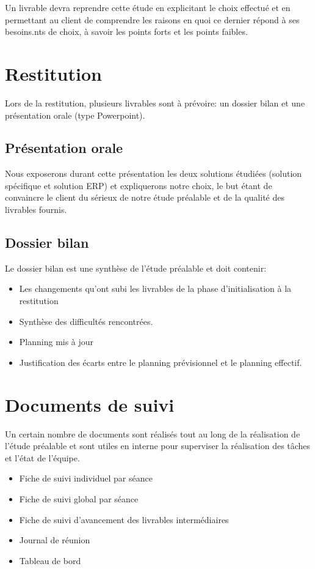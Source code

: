 		Un livrable devra reprendre cette étude en explicitant le choix effectué et en permettant au client de comprendre les raisons en quoi ce dernier répond à ses besoins.nts de choix, à savoir les points forts et les points faibles.


	\section{Restitution}

		Lors de la restitution, plusieurs livrables sont à prévoire: un dossier bilan et une présentation orale (type Powerpoint).

		\subsection{Présentation orale}

		Nous exposerons durant cette présentation les deux solutions étudiées (solution spécifique et solution ERP) et expliquerons notre choix, le but étant de convaincre le client du sérieux de notre étude préalable et de la qualité des livrables fournis.

		\subsection{Dossier bilan}

		Le dossier bilan est une synthèse de l'étude préalable et doit contenir:

		\begin{itemize}
		    \item Les changements qu'ont subi les livrables de la phase d'initialisation à la restitution
		    \item Synthèse des difficultés rencontrées.
		    \item Planning mis à jour
		    \item Justification des écarts entre le planning prévisionnel et le planning effectif.
		\end{itemize}



	\section{Documents de suivi}

		Un certain nombre de documents sont réalisés tout au long de la réalisation de l'étude préalable et sont utiles en interne pour superviser la réalisation des tâches et l'état de l'équipe.

		\begin{itemize}
		    \item Fiche de suivi individuel par séance
		    \item Fiche de suivi global par séance
		    \item Fiche de suivi d’avancement des livrables intermédiaires
		    \item Journal de réunion
		    \item Tableau de bord
		\end{itemize}